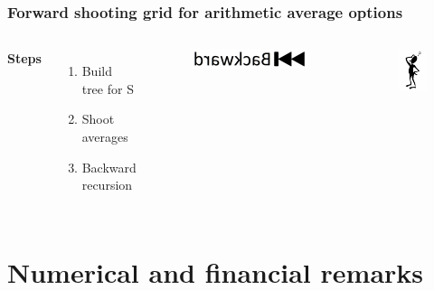 \documentclass{beamer}
\begin{document}
\begin{frame}[noframenumbering]
\frametitle{Forward shooting grid for arithmetic average options}
\begin{columns}[c] %

\textbf{Steps}
\begin{enumerate}
\item Build tree for S
\item Shoot averages
\item Backward recursion
\end{enumerate}

\begin{figure}
	\includegraphics[scale=0.1]{backward}
\end{figure}
\begin{figure}
	\includegraphics[scale=0.4]{question_mark}
\end{figure}

\end{columns}
\end{frame}


\section{Numerical and financial remarks}
\end{document}
